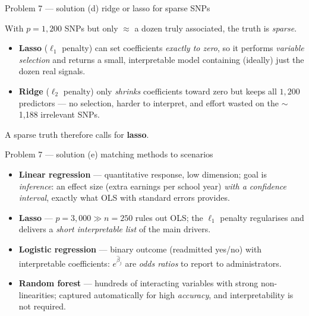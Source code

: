 \documentclass[aspectratio=169,11pt]{beamer}
\begin{document}
\begin{frame}{Problem 7 --- solution (d) ridge or lasso for sparse SNPs}
  \begin{solutionbox}
    With $p=1{,}200$ SNPs but only $\approx$ a dozen truly associated, the truth is \emph{sparse}.
    \medskip
    \begin{itemize}
      \item \textbf{Lasso} ($\ell_1$ penalty) can set coefficients \emph{exactly to zero}, so it
        performs \emph{variable selection} and returns a small, interpretable model containing
        (ideally) just the dozen real signals.
      \item \textbf{Ridge} ($\ell_2$ penalty) only \emph{shrinks} coefficients toward zero but
        keeps all $1{,}200$ predictors --- no selection, harder to interpret, and effort wasted on
        the $\sim$1{,}188 irrelevant SNPs.
    \end{itemize}
    A sparse truth therefore calls for \textbf{lasso}.
  \end{solutionbox}
\end{frame}

\begin{frame}{Problem 7 --- solution (e) matching methods to scenarios}
  \begin{solutionbox}
    \begin{itemize}
      \item[(i)] \textbf{Linear regression} --- quantitative response, low dimension; goal is
        \emph{inference}: an effect size (extra earnings per school year) \emph{with a confidence
        interval}, exactly what OLS with standard errors provides.
      \item[(ii)] \textbf{Lasso} --- $p=3{,}000\gg n=250$ rules out OLS; the $\ell_1$ penalty
        regularises and delivers a \emph{short interpretable list} of the main drivers.
      \item[(iii)] \textbf{Logistic regression} --- binary outcome (readmitted yes/no) with
        interpretable coefficients: $e^{\hat\beta_j}$ are \emph{odds ratios} to report to
        administrators.
      \item[(iv)] \textbf{Random forest} --- hundreds of interacting variables with strong
        non-linearities; captured automatically for high \emph{accuracy}, and interpretability is
        not required.
    \end{itemize}
  \end{solutionbox}
\end{frame}
\end{document}
